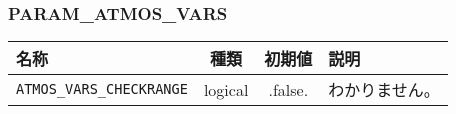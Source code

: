 \subsubsection{PARAM\_ATMOS\_VARS}
\begin{tabularx}{150mm}{|l|c|c|X|} \hline
 \rowcolor[gray]{0.9} 名称 & 種類 & 初期値 & 説明 \\ \hline
 \verb|ATMOS_VARS_CHECKRANGE| & logical & .false. & わかりません。 \\ \hline
\end{tabularx}

